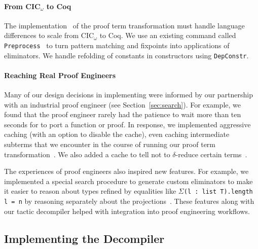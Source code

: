 \paragraph{From CIC$_{\omega}$ to Coq}
The implementation~ %
of the proof term transformation must handle language differences to scale from CIC$_{\omega}$ to Coq.
We use an existing command called \lstinline{Preprocess}~\cite{Ringer2019} to turn pattern matching and fixpoints into 
applications of eliminators.
We handle refolding of constants in constructors using \lstinline{DepConstr}.

\paragraph{Reaching Real Proof Engineers}
Many of our design decisions in implementing \toolname were informed by our partnership with
an industrial proof engineer (see Section~\ref{sec:search}).
For example, we found that the proof engineer rarely had the patience to wait more than ten seconds
for \toolname to port a function or proof.
In response, we implemented aggressive caching (with an option to disable the cache), even caching intermediate subterms that
we encounter in the course of running our proof term transformation~.
We also added a cache to tell \toolname not to $\delta$-reduce certain terms~. %

The experiences of proof engineers also inspired new features.
For example, we implemented a special search procedure to generate custom eliminators %
to make it easier to reason about types refined by equalities like $\Sigma$\lstinline{(l : list T).length l = n}
by reasoning separately about the projections~. %
These features along with our tactic decompiler helped with integration into proof engineering workflows.

\subsection{Implementing the Decompiler}
\label{sec:second}

